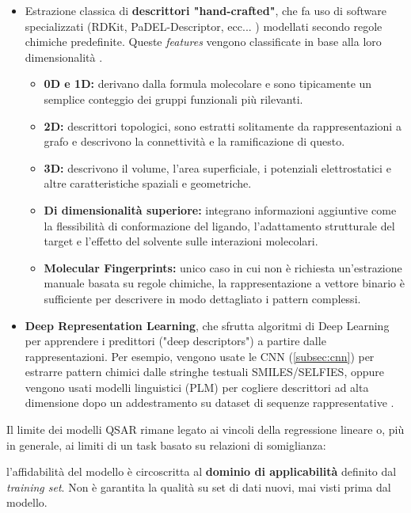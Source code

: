 \begin{itemize}
    \item Estrazione classica di \textbf{descrittori "hand-crafted"}, che fa uso di software specializzati (RDKit, PaDEL-Descriptor, ecc... \cite{ahmadMachineLearningDrugtarget2026}) modellati secondo regole chimiche predefinite. Queste \textit{features} vengono classificate in base alla loro dimensionalità \cite{odugbemiArtificialIntelligenceAntidiabetic2024}.
    \begin{itemize}
        \item \textbf{0D e 1D:} derivano dalla formula molecolare e sono tipicamente un semplice conteggio dei gruppi funzionali più rilevanti.
        \item \textbf{2D:} descrittori topologici, sono estratti solitamente da rappresentazioni a grafo e descrivono la connettività e la ramificazione di questo.
        \item \textbf{3D:} descrivono il volume, l'area superficiale, i potenziali elettrostatici e altre caratteristiche spaziali e geometriche.
        \item \textbf{Di dimensionalità superiore:} integrano informazioni aggiuntive come la flessibilità di conformazione del ligando, l'adattamento strutturale del target e l'effetto del solvente sulle interazioni molecolari.
        \item \textbf{Molecular Fingerprints:} unico caso in cui non è richiesta un'estrazione manuale basata su regole chimiche, la rappresentazione a vettore binario è sufficiente per descrivere in modo dettagliato i pattern complessi.
    \end{itemize}
    \item \textbf{Deep Representation Learning}, che sfrutta algoritmi di Deep Learning per apprendere i predittori ("deep descriptors") a partire dalle rappresentazioni. Per esempio, vengono usate le CNN (\ref{subsec:cnn}) per estrarre pattern chimici dalle stringhe testuali SMILES/SELFIES, oppure vengono usati modelli linguistici (PLM) per cogliere descrittori ad alta dimensione dopo un addestramento su dataset di sequenze rappresentative \cite{ahmadMachineLearningDrugtarget2026} \cite{koiralaAIIntegratedQSARModeling2025}.
\end{itemize}
Il limite dei modelli QSAR rimane legato ai vincoli della regressione lineare o, più in generale, ai limiti di un task basato su relazioni di somiglianza:

l'affidabilità del modello è circoscritta al \textbf{dominio di applicabilità} \cite{ahmadMachineLearningDrugtarget2026} definito dal \textit{training set}. Non è garantita la qualità su set di dati nuovi, mai visti prima dal modello.

